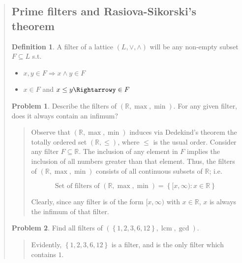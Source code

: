 \documentclass[a4paper, 12pt]{article}
\theoremstyle{definition}
\newtheorem{problem}{Problem}
\theoremstyle{definition}
\theoremstyle{definition}
\newtheorem{definition}{Definition}
\DeclareMathOperator{\lcm}{lcm}
\begin{document}
\begin{quote}
\subsection{Prime filters and Rasiova-Sikorski's theorem}

\begin{definition}
    A filter of a lattice $(L, \lor, \land)$ will be any non-empty subset $F \subseteq L$ s.t. 

    \begin{itemize}
        \item $x, y \in F \Rightarrow x \land y \in F$ 
        \item $x \in F$ and $x \leq y \Rightarrowy \in F$
    \end{itemize}
\end{definition}

\begin{problem}
    Describe the filters of $(\mathbb{R}, \max, \min)$. For any given filter, 
    does it always contain an infimum?
\end{problem}


\small
\begin{quote}

    Observe that $(\mathbb{R}, \max, \min)$ induces via Dedekind's theorem the
    totally ordered set $(\mathbb{R}, \leq)$, where $\leq$ is the usual order.
    Consider any filter $F \subseteq \mathbb{R}$. The inclusion of any element
    in $F$ implies the inclusion of all numbers greater than that element.
    Thus, the filters of $(\mathbb{R}, \max, \min)$ consists of all 
    continuous subsets of $\mathbb{R}$; i.e. 

    \begin{equation*}
        \text{Set of filters of $(\mathbb{R}, \max, \min)$} = \left\{ [x, \infty) : x \in \mathbb{R} \right\} 
    \end{equation*}

    Clearly, since any filter is of the form $[x, \infty)$ with $x \in
    \mathbb{R}$, $x$ is always the infimum of that filter.

\end{quote}
\normalsize

\begin{problem}
    Find all filters of $\left( \left\{ 1, 2, 3, 6, 12 \right\}, \lcm, \gcd  \right) $.
\end{problem}


\small
\begin{quote}


Evidently, $\left\{ 1, 2, 3, 6, 12 \right\} $ is a filter, 
and is the only filter which contains $1$.


\end{quote}
\end{quote}
\end{document}
